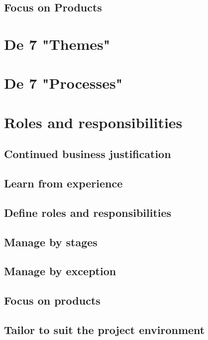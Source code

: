 \documentclass[12pt,twoside]{article}
\begin{document}
    \subsection{Focus on Products}

    \section{De 7 "Themes"}

    \section{De 7 "Processes"}

    \section{Roles and responsibilities}

    \subsection{Continued business justification}

    \subsection{Learn from experience}

    \subsection{Define roles and responsibilities}

    \subsection{Manage by stages}

    \subsection{Manage by exception}

    \subsection{Focus on products}

    \subsection{Tailor to suit the project environment}
\end{document}
